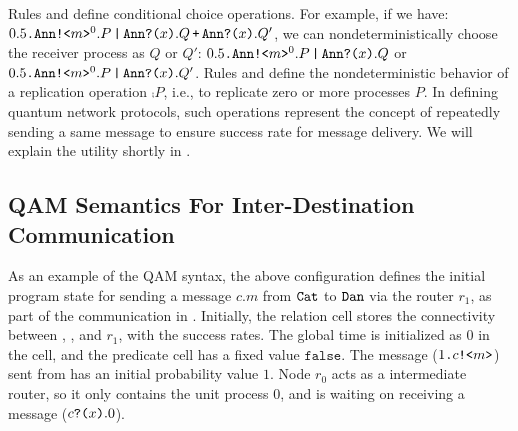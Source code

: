 Rules  and  define conditional choice operations. For example, if we have:
$0.5\texttt{.}\texttt{Ann}\texttt{!<}m\texttt{>}^0.P\,\texttt{|}\,\texttt{Ann}\texttt{?(}x\texttt{)}.Q\,\texttt{+}\,\texttt{Ann}\texttt{?(}x\texttt{)}.Q'$, 
we can nondeterministically choose the receiver process as $Q$ or $Q'$:
$0.5\texttt{.}\texttt{Ann}\texttt{!<}m\texttt{>}^0.P\,\texttt{|}\,\texttt{Ann}\texttt{?(}x\texttt{)}.Q$
or
$0.5\texttt{.}\texttt{Ann}\texttt{!<}m\texttt{>}^0.P\,\texttt{|}\,\texttt{Ann}\texttt{?(}x\texttt{)}.Q'$.
Rules  and  define the nondeterministic behavior of a replication operation $\comp{P}$,
i.e., to replicate zero or more processes $P$. In defining quantum network protocols, 
such operations represent the concept of repeatedly sending a same message to ensure success rate for message delivery.
We will explain the utility shortly in .

\subsection{QAM Semantics For Inter-Destination Communication} \label{sec:qamsyntax}

As an example of the QAM syntax, the above configuration defines the initial program state for sending a message $c.m$ from $\texttt{Cat}$ to $\texttt{Dan}$ via the router $r_1$, as part of the communication in . Initially, the relation cell stores the connectivity between , , and $r_1$, with the success rates. 
The global time is initialized as $0$ in the  cell, and the predicate cell has a fixed value $\texttt{false}$.
The message ($1\texttt{.}c\texttt{!<}m\texttt{>}$) sent from  has an initial probability value $1$.
Node $r_0$ acts as a intermediate router, so it only contains the unit process $0$, and  is waiting on receiving a message ($c\texttt{?(}x\texttt{)}.0$). 

